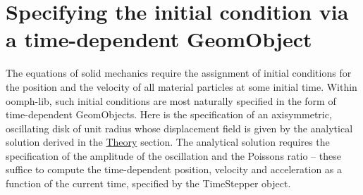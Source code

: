 \hypertarget{index_ic_object}{}\section{Specifying the initial condition via a time-\/dependent Geom\+Object}\label{index_ic_object}
The equations of solid mechanics require the assignment of initial conditions for the position and the velocity of all material particles at some initial time. Within {\ttfamily oomph-\/lib}, such initial conditions are most naturally specified in the form of time-\/dependent {\ttfamily Geom\+Objects}. Here is the specification of an axisymmetric, oscillating disk of unit radius whose displacement field is given by the analytical solution derived in the \hyperlink{index_theory}{Theory} section. The analytical solution requires the specification of the amplitude of the oscillation and the Poisson\textquotesingle{}s ratio -- these suffice to compute the time-\/dependent position, velocity and acceleration as a function of the current time, specified by the {\ttfamily Time\+Stepper} object.

